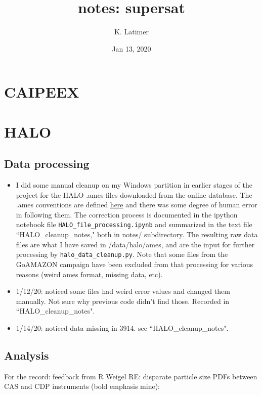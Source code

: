 \documentclass{article}
\title{notes: supersat}
\author{K. Latimer}
\date{Jan 13, 2020}
\begin{document}
\maketitle

\section{CAIPEEX}

\section{HALO}
\subsection{Data processing}
\begin{itemize}
	\item I did some manual cleanup on my Windows partition in earlier stages of the project for the HALO .ames files downloaded from the online database. The .ames conventions are defined \href{http://artefacts.ceda.ac.uk/formats/NASA-Ames/na-brief-guide.html}{here} and there was some degree of human error in following them. The correction process is documented in the ipython notebook file \texttt{HALO\_file\_processing.ipynb} and summarized in the text file ``HALO\_cleanup\_notes," both in notes/ subdirectory. The resulting raw data files are what I have saved in /data/halo/ames, and are the input for further processing by \texttt{halo\_data\_cleanup.py}. Note that some files from the GoAMAZON campaign have been excluded from that processing for various reasons (weird ames format, missing data, etc).
	\item 1/12/20: noticed some files had weird error values and changed them manually. Not sure why previous code didn't find those. Recorded in ``HALO\_cleanup\_notes".
	\item 1/14/20: noticed data missing in 3914. see ``HALO\_cleanup\_notes".
\end{itemize}

\subsection{Analysis}
For the record: feedback from R Weigel RE: disparate particle size PDFs between CAS and CDP instruments (bold emphasis mine):
\end{document}
